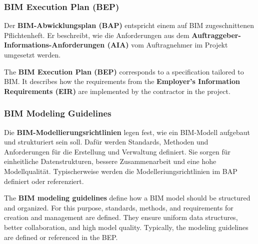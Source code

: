 \subsubsection{BIM Execution Plan (BEP)}
\begin{German}
    Der \textbf{BIM-Abwicklungsplan (BAP)} entspricht einem auf BIM zugeschnittenen Pflichtenheft. Er beschreibt, wie die Anforderungen aus dem \textbf{Auftraggeber-Informations-Anforderungen (AIA)} vom Auftragnehmer im Projekt umgesetzt werden. \cite{astourLehrbuchGrundlagenBIMArbeitsmethode2022}
\end{German}
\begin{English}
    The \textbf{BIM Execution Plan (BEP)} corresponds to a specification tailored to BIM. It describes how the requirements from the \textbf{Employer's Information Requirements (EIR)} are implemented by the contractor in the project. \cite{astourLehrbuchGrundlagenBIMArbeitsmethode2022}
\end{English}

\subsubsection{BIM Modeling Guidelines}
\begin{German}
    Die \textbf{BIM-Modellierungsrichtlinien} legen fest, wie ein BIM-Modell aufgebaut und strukturiert sein soll. Dafür werden Standards, Methoden und Anforderungen für die Erstellung und Verwaltung definiert. Sie sorgen für einheitliche Datenstrukturen, bessere Zusammenarbeit und eine hohe Modellqualität. Typischerweise werden die Modelleriungsrichtlinien im BAP definiert oder referenziert. \cite{astourLehrbuchGrundlagenBIMArbeitsmethode2022}
\end{German}
\begin{English}
    The \textbf{BIM modeling guidelines} define how a BIM model should be structured and organized. For this purpose, standards, methods, and requirements for creation and management are defined. They ensure uniform data structures, better collaboration, and high model quality. Typically, the modeling guidelines are defined or referenced in the BEP. \cite{astourLehrbuchGrundlagenBIMArbeitsmethode2022}
\end{English}

